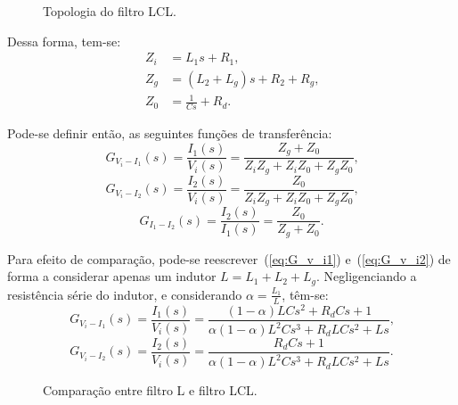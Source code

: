   \begin{figure}[htb]
    \centering{
      \def\svgwidth{\textwidth}
      }
    \renewcommand\figurename{Fig.}
    \caption{Topologia do filtro LCL.}
    \label{fig:LCL_topologia}
  \end{figure}

  Dessa forma, tem-se:
  \begin{equation}
  	\begin{split}
      Z_i & = L_1s +R_1 \text{,} \\
      Z_g & = (L_2 + L_g)s + R_2 + R_g \text{,} \\
      Z_0 & = \frac{1}{Cs} + R_d \text{.}
    \end{split}
  \end{equation}

  Pode-se definir então, as seguintes funções de transferência:
  \begin{equation}
    G_{V_i-I_1}(s) = \frac{I_1(s)}{V_i(s)} = \frac{Z_g + Z_0}{Z_iZ_g
    	+ Z_iZ_0 + Z_gZ_0} \text{,}
    \label{eq:G_v_i1}
  \end{equation}
  \begin{equation}
    G_{V_i-I_2}(s) = \frac{I_2(s)}{V_i(s)} = \frac{Z_0}{Z_iZ_g
    	+ Z_iZ_0 + Z_gZ_0} \text{,}
    \label{eq:G_v_i2}
  \end{equation}
  \begin{equation}
    G_{I_1-I_2}(s) = \frac{I_2(s)}{I_1(s)} = \frac{Z_0}{Z_g + Z_0}
    	 \text{.}
    \label{eq:G_i1_i2}
  \end{equation}

  Para efeito de comparação, pode-se reescrever~(\ref{eq:G_v_i1}) e~(\ref{eq:G_v_i2}) de forma a considerar apenas um indutor $L = L_1 + L_2 + L_g$. Negligenciando a resistência série do indutor, e considerando $\alpha = \frac{L_1}{L}$, têm-se:
  \begin{equation}
    G_{V_i-I_1}(s) = \frac{I_1(s)}{V_i(s)} =
    	\frac{(1-\alpha)LCs^2+R_dCs+1}{\alpha(1-\alpha)L^2Cs^3+R_dLCs^2+Ls} \text{,}
  \end{equation}
  \begin{equation}
    G_{V_i-I_2}(s) = \frac{I_2(s)}{V_i(s)} =
    	\frac{R_dCs+1}{\alpha(1-\alpha)L^2Cs^3+R_dLCs^2+Ls}  \text{.}
    \label{eq:G_v_i2_2}
  \end{equation}

  \begin{figure}[htb]
    \centering{
      \def\svgwidth{\textwidth}
      }
    \caption{Comparação entre filtro L e filtro LCL.}
    \label{fig:L_vs_LCL}
  \end{figure}

